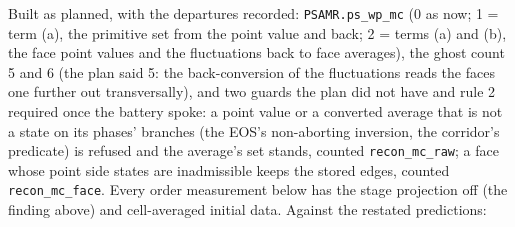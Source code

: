 \documentclass[11pt,a4paper]{article}
\newcommand{\code}[1]{\texttt{\small #1}}
\begin{document}
Built as planned, with the departures recorded: \code{PSAMR.ps\_wp\_mc}
(0 as now; 1 = term (a), the primitive set from the point value and
back; 2 = terms (a) and (b), the face point values and the
fluctuations back to face averages), the ghost count 5 and 6 (the plan
said 5: the back-conversion of the fluctuations reads the faces one
further out transversally), and two guards the plan did not have and
rule 2 required once the battery spoke: a point value or a converted
average that is not a state on its phases' branches (the EOS's
non-aborting inversion, the corridor's predicate) is refused and the
average's set stands, counted \code{recon\_mc\_raw}; a face whose point
side states are inadmissible keeps the stored edges, counted
\code{recon\_mc\_face}.  Every order measurement below has the stage
projection off (the finding above) and cell-averaged initial data.
Against the restated predictions:
\end{document}
